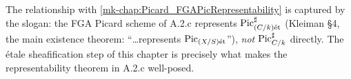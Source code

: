 The relationship with \ref{mk-chap:Picard_FGAPicRepresentability} is captured by
the slogan: the FGA Picard scheme of A.2.c represents
\(\operatorname{Pic}^\sharp_{(C/k)\mathrm{\acute{e}t}}\) (Kleiman \S 4, the main existence theorem: ``\dots represents
\(\operatorname{Pic}_{(X/S)\mathrm{\acute{e}t}}\)''), \emph{not} \(\operatorname{Pic}^\sharp_{C/k}\) directly. The \'etale
sheafification step of this chapter is precisely what makes the
representability theorem in A.2.c well-posed.
